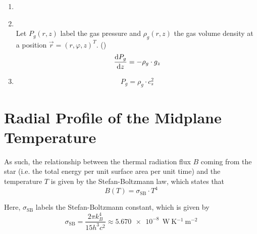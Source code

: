 \begin{enumerate}
        \item {}
    
        \item {} \\
            Let $P_g(r,z)$ label the gas pressure and $\rho_g(r,z)$ the gas volume density 
            at a position $\vec r=(r,\varphi,z)^T$. ()
            \begin{equation}
                \label{eq:hydrostatic_equilibrium}
                \deriv{P_g}{z} = - \rho_g \cdot g_z  %
            \end{equation}
    
        \item {}
            \begin{equation}
                \label{eq:isothermal_condition}
                P_g = \rho_g \cdot c_s^2
            \end{equation}
    
    \end{enumerate}
    
    
    

\clearpage\section{Radial Profile of the Midplane Temperature}

     As such, the relationship between the
    thermal radiation flux $B$ coming from the star (i.e. the total energy per unit surface area 
    per unit time) and the temperature $T$ is given by the Stefan-Boltzmann law, which states that
    \begin{equation}
        \label{eq:stefan_boltzmann_law}
        B(T) = \sigma_\text{SB}\cdot T^4   %
    \end{equation}

    Here, $\sigma_\text{SB}$ labels the Stefan-Boltzmann constant, which is given by 
    \begin{equation}
        \sigma_\text{SB}
            = \frac{2\pi k_B^4}{15h^3 c^2}
            \approx \SI{5.670e-8}{\ \watt\ \kelvin^{-1}\ \meter^{-2}}
    \end{equation}

